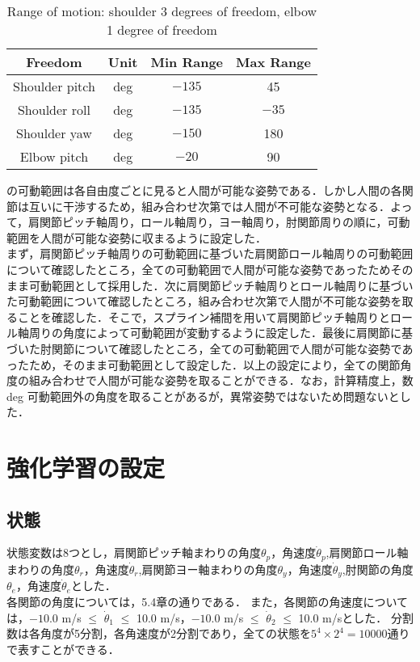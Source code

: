
\begin{table}[tb]
  \begin{center}
    \caption{Range of motion: shoulder 3 degrees of freedom, elbow 1 degree of freedom}

    \begin{tabular}{c|c|c|c}
      \hline
      Freedom & Unit & Min Range & Max Range \\
      \hline
      Shoulder pitch & deg & $-135$ & 45 \\
      Shoulder roll & deg & $-135$ & $-35$ \\
      Shoulder yaw & deg & $-150$ & 180 \\
      Elbow pitch & deg & $-20$ & 90 \\
      \hline
    \end{tabular}
  \end{center}
\end{table}

の可動範囲は各自由度ごとに見ると人間が可能な姿勢である．しかし人間の各関節は互いに干渉するため，組み合わせ次第では人間が不可能な姿勢となる．よって，肩関節ピッチ軸周り，ロール軸周り，ヨー軸周り，肘関節周りの順に，可動範囲を人間が可能な姿勢に収まるように設定した．\\
まず，肩関節ピッチ軸周りの可動範囲に基づいた肩関節ロール軸周りの可動範囲について確認したところ，全ての可動範囲で人間が可能な姿勢であったためそのまま可動範囲として採用した．次に肩関節ピッチ軸周りとロール軸周りに基づいた可動範囲について確認したところ，組み合わせ次第で人間が不可能な姿勢を取ることを確認した．そこで，スプライン補間\cite{spline}を用いて肩関節ピッチ軸周りとロール軸周りの角度によって可動範囲が変動するように設定した．最後に肩関節に基づいた肘関節について確認したところ，全ての可動範囲で人間が可能な姿勢であったため，そのまま可動範囲として設定した．以上の設定により，全ての関節角度の組み合わせで人間が可能な姿勢を取ることができる．なお，計算精度上，数 deg 可動範囲外の角度を取ることがあるが，異常姿勢ではないため問題ないとした．


\section{強化学習の設定}
\subsection{状態}
状態変数は8つとし，肩関節ピッチ軸まわりの角度$\theta_{p}$，角速度$\dot{\theta}_{p}$,肩関節ロール軸まわりの角度$\theta_{r}$，角速度$\dot{\theta}_{r}$,肩関節ヨー軸まわりの角度$\theta_{y}$，角速度$\dot{\theta}_{y}$,肘関節の角度$\theta_{e}$，角速度$\dot{\theta}_{e}$とした．\\
各関節の角度については，5.4章の通りである．
また，各関節の角速度については，$-10.0$ m/s $\le$ $\dot{\theta}_{1}$ $\le$ 10.0 m/s，$-10.0$ m/s $\le$ $\dot{\theta}_{2}$ $\le$ 10.0 m/sとした．
分割数は各角度が5分割，各角速度が2分割であり，全ての状態を$5^{4}\times 2^{4}=10000$通りで表すことができる．
